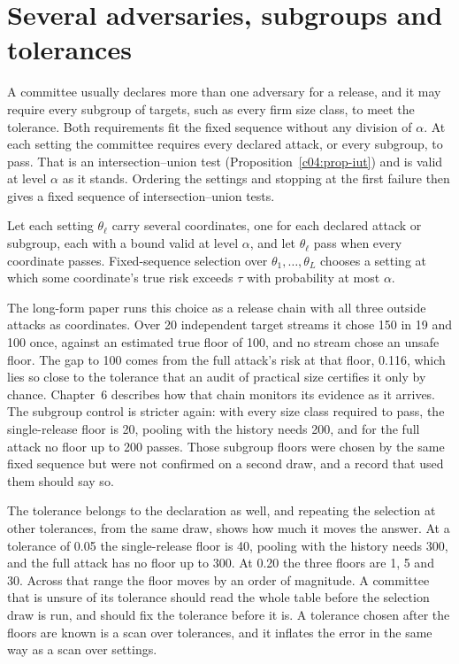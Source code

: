 \section{Several adversaries, subgroups and tolerances}

A committee usually declares more than one adversary for a release, and it may require
every subgroup of targets, such as every firm size class, to meet the tolerance. Both
requirements fit the fixed sequence without any division of $\alpha$. At each setting the
committee requires every declared attack, or every subgroup, to pass. That is an
intersection--union test (Proposition~\ref{c04:prop-iut}) and is valid at level $\alpha$
as it stands. Ordering the settings and stopping at the first failure then gives a fixed
sequence of intersection--union tests.

\begin{corollary}\label{c05:cor-chain}
Let each setting $\theta_\ell$ carry several coordinates, one for each declared attack or
subgroup, each with a bound valid at level $\alpha$, and let $\theta_\ell$ pass when every
coordinate passes. Fixed-sequence selection over $\theta_1, \dots, \theta_L$ chooses a
setting at which some coordinate's true risk exceeds $\tau$ with probability at most
$\alpha$.
\end{corollary}

The long-form paper runs this choice as a release chain with all three outside attacks as
coordinates. Over 20 independent target streams it chose 150 in 19 and 100 once, against
an estimated true floor of 100, and no stream chose an unsafe floor.
The gap to 100 comes from the full attack's risk at that floor, 0.116, which lies so
close to the tolerance that an audit of practical size certifies it only by chance.
Chapter~6 describes how that chain monitors its evidence as it arrives. The subgroup
control is stricter again: with every size class required to pass, the single-release
floor is 20, pooling with the history needs 200, and for the full attack no floor up to
200 passes.
Those subgroup floors were chosen by the same fixed sequence but were not confirmed on a
second draw, and a record that used them should say so.

The tolerance belongs to the declaration as well, and repeating the selection at other
tolerances, from the same draw, shows how much it moves the answer. At a tolerance of 0.05 the
single-release floor is 40, pooling with the history needs 300, and the full attack has
no floor up to 300. At 0.20 the three floors are 1, 5 and 30.
Across that range the floor moves by an order of magnitude. A committee that is unsure
of its tolerance should read the whole table before the selection draw is run, and
should fix the tolerance before it is. A tolerance chosen after the floors are known is a
scan over tolerances, and it inflates the error in the same way as a scan over settings.

